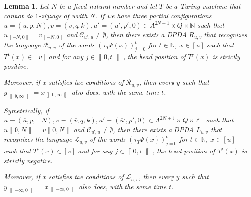 \documentclass{llncs}
\newtheorem{lem}{Lemma}
\newcommand{\Zset}{{\mathbb Z}}
\newcommand{\Nset}{{\mathbb N}}
\newcommand{\co}[2]{\left\llbracket #1,#2\right\llbracket}\newcommand{\cc}[2]{\left\llbracket #1,#2\right\rrbracket}\newcommand{\oo}[2]{\left\rrbracket #1,#2\right\llbracket}\newcommand{\oc}[2]{\left\rrbracket #1,#2\right\rrbracket}\newcommand{\ci}[1]{\co{#1}\infty}\newcommand{\io}[1]{\oo{-\infty}{#1}}\newcommand{\oi}[1]{\oo{#1}\infty}\newcommand{\ic}[1]{\oc{-\infty}{#1}}
\newcommand{\scc}[2]{_{\cc{#1}{#2}}}\newcommand{\sco}[2]{_{\co{#1}{#2}}}\newcommand{\soo}[2]{_{\oo{#1}{#2}}}\newcommand{\soc}[2]{_{\oc{#1}{#2}}}\newcommand{\sci}[1]{_{\ci{#1}}}\newcommand{\sio}[1]{_{\io{#1}}}\newcommand{\soi}[1]{_{\oi{#1}}}\newcommand{\sic}[1]{_{\ic{#1}}}
\begin{document}
\begin{lem}\label{l:LRcycleDPDA}
Let $N$ be a fixed natural number and let $T$ be a Turing machine that cannot do $1$-zigzags of width $N$.
If we have three partial configurations $u=(\overline{u},p,N),v=(\overline{v},q,k),u'=(\overline{u}',p',0)\in A^{2N+1}\times Q\times \Nset$ such that $u\scc{-N}0 = v\scc{-N}0$ and $\mathcal C_{u',u}\ne\emptyset$, then there exists a DPDA $R_{u,v}$ that recognizes the language $\mathcal R_{u,v}$ of the words $(\tau_T\Psi(x))_{j=0}^t$ for $t\in\Nset$, $x\in [u]$ such that $T^t(x)\in [v]$ and for any $j\in \co0t$, the head position of $T^j(x)$ is strictly positive.

Moreover, if $x$ satisfies the conditions of $\mathcal R_{u,v}$, then every $y$ such that $y\soi0=x\soi0$ also does, with the same time $t$.

Symetrically, if $u=(\overline{u},p,-N),v=(\overline{v},q,k),u'=(\overline{u}',p',0)\in A^{2N+1}\times Q\times \Zset_-$ such that $u\cc0N = v\cc0N$ and $\mathcal C_{u',u}\ne\emptyset$, then there exists a DPDA $L_{u,v}$ that recognizes the language $\mathcal L_{u,v}$ of the words $(\tau_T\Psi(x))_{j=0}^t$ for $t\in\Nset$, $x\in [u]$ such that $T^t(x)\in [v]$ and for any $j\in \co0t$, the head position of $T^j(x)$ is strictly negative.

Moreover, if $x$ satisfies the conditions of $\mathcal L_{u,v}$, then every $y$ such that $y\sio0=x\sio0$ also does, with the same time $t$.
\end{lem}
\end{document}
